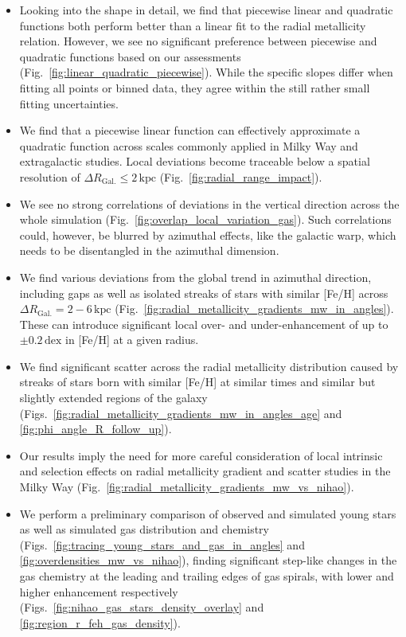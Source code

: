 \documentclass[fleqn,usenatbib]{mnras}
\begin{document}
\begin{itemize}
    \item Looking into the shape in detail, we find that piecewise linear and quadratic functions both perform better than a linear fit to the radial metallicity relation. However, we see no significant preference between piecewise and quadratic functions based on our assessments (Fig.~\ref{fig:linear_quadratic_piecewise}). While the specific slopes differ when fitting all points or binned data, they agree within the still rather small fitting uncertainties.
    \item We find that a piecewise linear function can effectively approximate a quadratic function across scales commonly applied in Milky Way and extragalactic studies. Local deviations become traceable below a spatial resolution of $\Delta R_\mathrm{Gal.} \leq 2\,\mathrm{kpc}$ (Fig.~\ref{fig:radial_range_impact}).
    \item We see no strong correlations of deviations in the vertical direction across the whole simulation (Fig.~\ref{fig:overlap_local_variation_gas}). Such correlations could, however, be blurred by azimuthal effects, like the galactic warp, which needs to be disentangled in the azimuthal dimension. 
    \item We find various deviations from the global trend in azimuthal direction, including gaps as well as isolated streaks of stars with similar [Fe/H] across $\Delta R_\mathrm{Gal.} = 2-6\,\mathrm{kpc}$ (Fig.~\ref{fig:radial_metallicity_gradients_mw_in_angles}). These can introduce significant local over- and under-enhancement of up to $\pm 0.2\,\mathrm{dex}$ in [Fe/H] at a given radius.
    \item We find significant scatter across the radial metallicity distribution caused by streaks of stars born with similar [Fe/H] at similar times and similar but slightly extended regions of the galaxy (Figs.~\ref{fig:radial_metallicity_gradients_mw_in_angles_age} and \ref{fig:phi_angle_R_follow_up}).
    \item Our results imply the need for more careful consideration of local intrinsic and selection effects on radial metallicity gradient and scatter studies in the Milky Way (Fig.~\ref{fig:radial_metallicity_gradients_mw_vs_nihao}).
    \item We perform a preliminary comparison of observed and simulated young stars as well as simulated gas distribution and chemistry (Figs.~\ref{fig:tracing_young_stars_and_gas_in_angles} and \ref{fig:overdensities_mw_vs_nihao}), finding significant step-like changes in the gas chemistry at the leading and trailing edges of gas spirals, with lower and higher enhancement respectively (Figs.~\ref{fig:nihao_gas_stars_density_overlay} and \ref{fig:region_r_feh_gas_density}).

\end{itemize}
\end{document}
